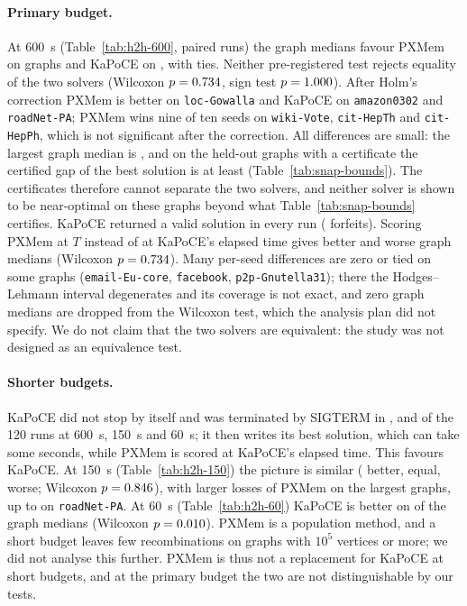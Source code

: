 \paragraph{Primary budget.}  At \SI{600}{s} (Table~\ref{tab:h2h-600},
\numHHSixRuns{} paired runs) the graph medians favour PXMem on
\numHHSixBetter{} graphs and KaPoCE on \numHHSixWorse{}, with
\numHHSixEqual{} ties.  Neither pre-registered test rejects equality of the
two solvers (Wilcoxon $p=0.734$, sign test
$p=1.000$).  After Holm's correction PXMem is better on
\texttt{loc-Gowalla} and KaPoCE on \texttt{amazon0302} and
\texttt{roadNet-PA}; PXMem wins nine of ten seeds on \texttt{wiki-Vote},
\texttt{cit-HepTh} and \texttt{cit-HepPh}, which is not significant after the
correction.  All differences are small: the largest graph median is
\numHHSixMaxAbs{}, and on the held-out graphs with a certificate the
certified gap of the best solution is at least \numSnapGapMinHeld{}
(Table~\ref{tab:snap-bounds}).  The certificates therefore cannot separate
the two solvers, and neither solver is shown to be near-optimal on these
graphs beyond what Table~\ref{tab:snap-bounds} certifies.  KaPoCE returned a
valid solution in every run (\numHHSixForfeitK{} forfeits).  Scoring PXMem at
$T$ instead of at KaPoCE's elapsed time gives \numHHSixAtTBetter{} better and
\numHHSixAtTWorse{} worse graph medians (Wilcoxon $p=0.734$).
Many per-seed differences are zero or tied on some graphs
(\texttt{email-Eu-core}, \texttt{facebook}, \texttt{p2p-Gnutella31}); there
the Hodges--Lehmann interval degenerates and its coverage is not exact, and
zero graph medians are dropped from the Wilcoxon test, which the analysis
plan did not specify.  We do not claim that the two solvers are
equivalent: the study was not designed as an equivalence test.

\paragraph{Shorter budgets.}  KaPoCE did not stop by itself and was
terminated by SIGTERM in \numHHSixSigterm{}, \numHHOneFiftySigterm{} and
\numHHSixtySigterm{} of the 120 runs at \SI{600}{s}, \SI{150}{s} and
\SI{60}{s}; it then writes its best solution, which can take some seconds,
while PXMem is scored at KaPoCE's elapsed time.  This favours KaPoCE.  At
\SI{150}{s} (Table~\ref{tab:h2h-150}) the picture is similar (\numHHOneFiftyBetter{} better, \numHHOneFiftyEqual{}
equal, \numHHOneFiftyWorse{} worse; Wilcoxon $p=0.846$),
with larger losses of PXMem on the largest graphs, up to
\numHHOneFiftyMaxAbs{} on \texttt{roadNet-PA}.  At \SI{60}{s}
(Table~\ref{tab:h2h-60}) KaPoCE is better on \numHHSixtyWorse{} of the
\numHHSixtyGraphs{} graph medians (Wilcoxon $p=0.010$).  PXMem is
a population method, and a short budget leaves few recombinations on graphs
with $10^5$ vertices or more; we did not analyse this further.  PXMem is thus
not a replacement for KaPoCE at short budgets, and at the primary budget the
two are not distinguishable by our tests.

